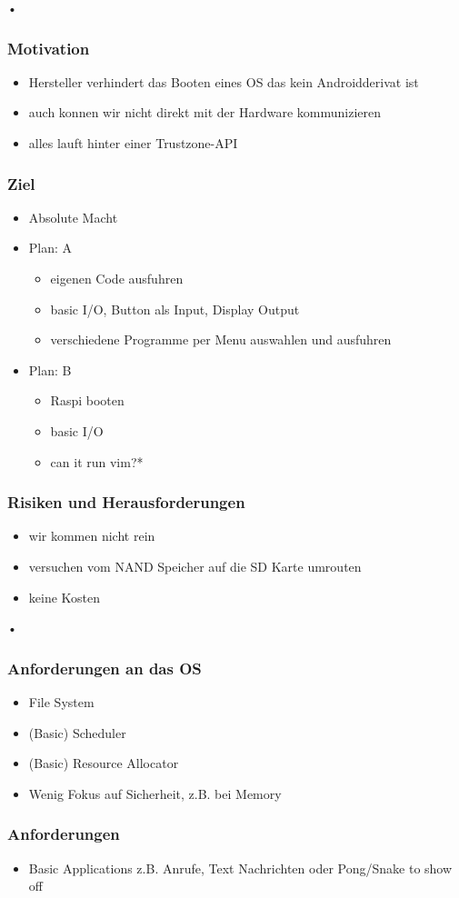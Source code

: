 \documentclass[11pt]{beamer}
\begin{document}
\begin{frame}{•}
\frametitle{Motivation}
\begin{itemize}
\item<1-> Hersteller verhindert das Booten eines OS das kein Androidderivat ist
\item<2-> auch konnen wir nicht direkt mit der Hardware kommunizieren
\item<3-> alles lauft hinter einer Trustzone-API
\end{itemize}
\end{frame}
\begin{frame}
\frametitle{Ziel}
\begin{itemize}
\item<1-> Absolute Macht
\item<2-> Plan: A
	\begin{itemize}
	\item<3-> eigenen Code ausfuhren
	\item<4-> basic I/O, Button als Input, Display Output
	\item<5-> verschiedene Programme per Menu auswahlen und ausfuhren
	\end{itemize}
\item<6-> Plan: B
	\begin{itemize}
		\item Raspi booten
		\item basic I/O
		\item can it run vim?*
	\end{itemize}
\end{itemize}
\end{frame}
\begin{frame}
\frametitle{Risiken und Herausforderungen}
\begin{itemize}
\item<1-> wir kommen nicht rein
\item<2-> versuchen vom NAND Speicher auf die SD Karte umrouten
\item<3-> keine Kosten
\end{itemize}
\end{frame}
\begin{frame}{•}
\frametitle{Anforderungen an das OS}
\begin{itemize}
\item<1-> File System
\item<2-> (Basic) Scheduler
\item<3-> (Basic) Resource Allocator
\item<4-> Wenig Fokus auf Sicherheit, z.B. bei Memory
\end{itemize}
\end{frame}
\begin{frame}
\frametitle{Anforderungen}
\begin{itemize}
\item<1-> Basic Applications z.B. Anrufe, Text Nachrichten oder Pong/Snake \newline to show off
\end{itemize}

\end{frame}
\end{document}
